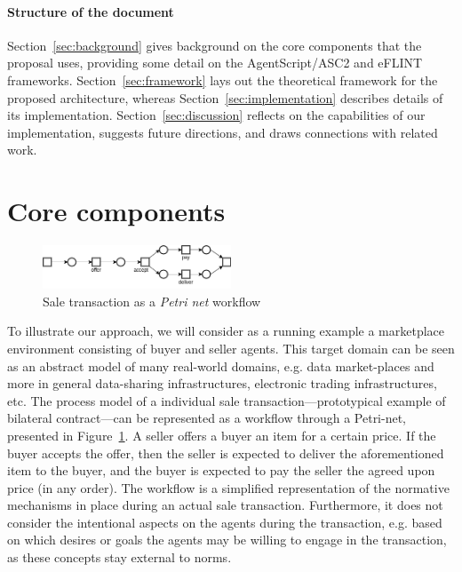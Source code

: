 \paragraph{Structure of the document}
Section~\ref{sec:background} gives background on the core components that the proposal uses, providing some detail on the AgentScript/ASC2 and eFLINT frameworks. Section~\ref{sec:framework} lays out the theoretical framework for the proposed architecture, whereas Section~\ref{sec:implementation} describes details of its implementation. Section~\ref{sec:discussion} reflects on the capabilities of our implementation, suggests future directions, and draws connections with related work.


\section{Core components\label{sec:background}}

\begin{figure}[!tb]
    \centering
    \includegraphics[width=0.5\textwidth]{ch4/sale-drawio.png}
    \caption{Sale transaction as a \textit{Petri net} workflow}
    \label{fig:sale}
\end{figure}
%

To illustrate our approach, we will consider as a running example a marketplace environment consisting of buyer and seller agents. This target domain can be seen as an abstract model of many real-world domains, e.g. data market-places and more in general data-sharing infrastructures, electronic trading infrastructures, etc. The process model of a individual sale transaction---prototypical example of bilateral contract---can be represented as a workflow through a Petri-net, presented in Figure~\ref{fig:sale}. A seller offers a buyer an item for a certain price. If the buyer accepts the offer, then the seller is expected to deliver the aforementioned item to the buyer, and the buyer is expected to pay the seller the agreed upon price (in any order). The workflow is a simplified representation of the normative mechanisms in place during an actual sale transaction. Furthermore, it does not consider the intentional aspects on the agents during the transaction, e.g. based on which desires or goals the agents may be willing to engage in the transaction, as these concepts stay external to norms.
%
